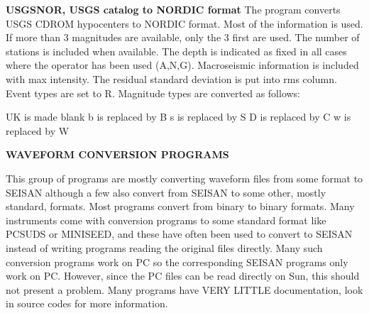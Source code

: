 \textbf{USGSNOR, USGS catalog to NORDIC format} \newline
{}
The program converts USGS CDROM hypocenters to NORDIC format. Most of the information is used. If more than 3 magnitudes are available, only the 3 first are used. The number of stations is 
included when available. The depth is indicated as fixed in all cases where the operator has been used (A,N,G). Macroseismic information is included with max intensity. The residual standard deviation is put into rms column. Event types are set to R. Magnitude types are converted as follows: 

UK is made blank \newline
b is replaced by B \newline
s is replaced by S \newline
D is replaced by C \newline
w is replaced by W 

\textbf{WAVEFORM CONVERSION PROGRAMS}

This group of programs are mostly converting waveform files from some format to SEISAN although a few also convert from SEISAN to some other, mostly standard, formats. Most programs convert from binary to binary formats. \newline
Many instruments come with conversion programs to some standard format like PCSUDS or MINISEED, and these have often been used to convert to SEISAN instead of writing programs reading the original files directly. Many such conversion programs work on PC so the corresponding SEISAN programs only work on PC. However, since the PC files can be read directly on Sun, this should not present a problem. Many programs have VERY LITTLE documentation, look in source codes for more information. 

